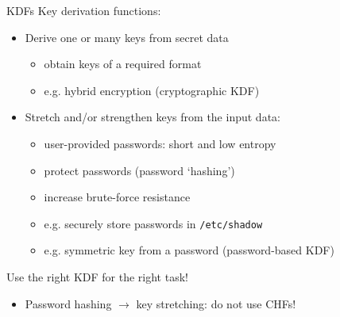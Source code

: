 \begin{frame}{KDFs}
  Key derivation functions:
  \begin{itemize}[<+(1)->]
    \item Derive one or many keys from secret data
    \begin{itemize}
      \item obtain keys of a required format
      \item e.g. hybrid encryption (cryptographic KDF)
    \end{itemize}
    \item Stretch and/or strengthen keys from the input data:
    \begin{itemize}
      \item user-provided passwords: short and low entropy
      \item protect passwords (password `hashing')
      \item increase brute-force resistance
      \item e.g. securely store passwords in \texttt{/etc/shadow}
      \item e.g. symmetric key from a password (password-based KDF)
    \end{itemize}
  \end{itemize}

  \vspace*{1em}

  \pause
  Use the right KDF for the right task!
  \begin{itemize}
    \pause\item Password hashing $\to$ key stretching: do not use CHFs!
  \end{itemize}
\end{frame}

